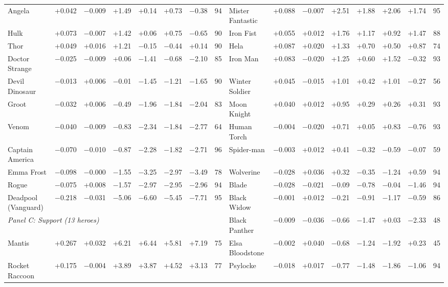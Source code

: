 \documentclass[11pt]{article}
\begin{document}
\begin{landscape}
\begin{center}
{\begin{tabular}{l r r r r r r r @{\hspace{1.6em}} l r r r r r r r}
Angela & +0.042 & $-$0.009 & +1.49 & +0.14 & +0.73 & $-$0.38 & 94 & Mister Fantastic & +0.088 & $-$0.007 & +2.51 & +1.88 & +2.06 & +1.74 & 95 \\
Hulk & +0.073 & $-$0.007 & +1.42 & +0.06 & +0.75 & $-$0.65 & 90 & Iron Fist & +0.055 & +0.012 & +1.76 & +1.17 & +0.92 & +1.47 & 88 \\
Thor & +0.049 & +0.016 & +1.21 & $-$0.15 & $-$0.44 & +0.14 & 90 & Hela & +0.087 & +0.020 & +1.33 & +0.70 & +0.50 & +0.87 & 74 \\
Doctor Strange & $-$0.025 & $-$0.009 & +0.06 & $-$1.41 & $-$0.68 & $-$2.10 & 85 & Iron Man & +0.083 & $-$0.020 & +1.25 & +0.60 & +1.52 & $-$0.32 & 93 \\
Devil Dinosaur & $-$0.013 & +0.006 & $-$0.01 & $-$1.45 & $-$1.21 & $-$1.65 & 90 & Winter Soldier & +0.045 & $-$0.015 & +1.01 & +0.42 & +1.01 & $-$0.27 & 56 \\
Groot & $-$0.032 & +0.006 & $-$0.49 & $-$1.96 & $-$1.84 & $-$2.04 & 83 & Moon Knight & +0.040 & +0.012 & +0.95 & +0.29 & +0.26 & +0.31 & 93 \\
Venom & $-$0.040 & $-$0.009 & $-$0.83 & $-$2.34 & $-$1.84 & $-$2.77 & 64 & Human Torch & $-$0.004 & $-$0.020 & +0.71 & +0.05 & +0.83 & $-$0.76 & 93 \\
Captain America & $-$0.070 & $-$0.010 & $-$0.87 & $-$2.28 & $-$1.82 & $-$2.71 & 96 & Spider-man & $-$0.003 & +0.012 & +0.41 & $-$0.32 & $-$0.59 & $-$0.07 & 59 \\
Emma Frost & $-$0.098 & $-$0.000 & $-$1.55 & $-$3.25 & $-$2.97 & $-$3.49 & 78 & Wolverine & $-$0.028 & +0.036 & +0.32 & $-$0.35 & $-$1.24 & +0.59 & 94 \\
Rogue & $-$0.075 & +0.008 & $-$1.57 & $-$2.97 & $-$2.95 & $-$2.96 & 94 & Blade & $-$0.028 & $-$0.021 & $-$0.09 & $-$0.78 & $-$0.04 & $-$1.46 & 94 \\
Deadpool (Vanguard) & $-$0.218 & $-$0.031 & $-$5.06 & $-$6.60 & $-$5.45 & $-$7.71 & 95 & Black Widow & $-$0.001 & +0.012 & $-$0.21 & $-$0.91 & $-$1.17 & $-$0.59 & 86 \\
\multicolumn{8}{l}{\emph{Panel C: Support (13 heroes)}} & Black Panther & $-$0.009 & $-$0.036 & $-$0.66 & $-$1.47 & +0.03 & $-$2.33 & 48 \\
Mantis & +0.267 & +0.032 & +6.21 & +6.44 & +5.81 & +7.19 & 75 & Elsa Bloodstone & $-$0.002 & +0.040 & $-$0.68 & $-$1.24 & $-$1.92 & +0.23 & 45 \\
Rocket Raccoon & +0.175 & $-$0.004 & +3.89 & +3.87 & +4.52 & +3.13 & 77 & Psylocke & $-$0.018 & +0.017 & $-$0.77 & $-$1.48 & $-$1.86 & $-$1.06 & 94 \\

\end{tabular}}
\end{center}
\end{landscape}
\end{document}
